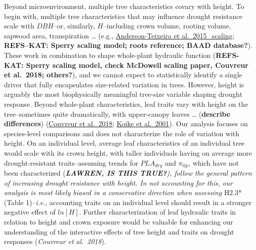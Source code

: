 \documentclass[]{article}
\begin{document}
Beyond microenvironment, multiple tree characteristics covary with
height. To begin with, multiple tree characteristics that may influence
drought resistance scale with \(DBH\)--or, similarly, \(H\)--including
crown volume, rooting volume, sapwood area, transpiration \ldots{}
(e.g.,
\href{https://besjournals.onlinelibrary.wiley.com/doi/abs/10.1111/1365-2435.12470}{Anderson-Teixeira
et al.~2015\_scaling}; \textbf{REFS--KAT: Sperry scaling model; roots
reference; BAAD database?}). These work in combination to shape
whole-plant hydraulic function (\textbf{REFS-KAT: Sperry scaling model,
check McDowell scaling paper, Couvreur et al.~2018; others?}), and we
cannot expect to statistically identify a single driver that fully
encapsulates size-related variation in trees. However, height is
arguably the most biophysically meaningful tree-size variable shaping
drought response. Beyond whole-plant characteristics, leaf traits vary
with height on the tree--sometimes quite dramatically, with upper-canopy
leaves \ldots{} (\textbf{describe differences})
(\href{https://onlinelibrary-wiley-com.smithsonian.idm.oclc.org/doi/full/10.1111/pce.13322?casa_token=92wZmmL9EhQAAAAA\%3A2cq5yAR0_pyM9TVBa5o_DKkhDuHwIUFryxZ43zsdTgQyEa8f0ZfiEHZ5SHV7fFB49UkzXNvL7nMwabU}{Couvreur
et al.~2018};
\href{https://watermark.silverchair.com/21-12-13-951.pdf}{Koike et
al.~2001}). Our analysis focuses on species-level comparisons and does
not characterize the role of variation with height. On an individual
level, average leaf characteristics of an individual tree would scale
with its crown height, with taller individuals having on average more
drought-resistant traits--assuming trends for \(PLA_{dry}\) and
\(\pi_{tlp}\), which have not been characterized (\emph{\textbf{LAWREN,
IS THIS TRUE?}), follow the general pattern of increasing drought
resistance with height. In not accounting for this, our analysis is most
likely biased in a conservative direction when assessing }H2.3* (Table
1)--\emph{i.e.}, accounting traits on an individual level should result
in a stronger negative effect of \(ln[H]\). Further characterization of
leaf hydraulic traits in relation to height and crown exposure would be
valuable for enhancing our understanding of the interactive effects of
tree height and traits on drought responses (\emph{Couvreur et
al.~2018}).
\end{document}
